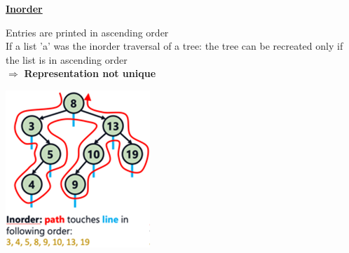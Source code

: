         {\centering\underline{\textbf{Inorder}} \par}
            \begin{minipage}{0.49\linewidth}
                
                Entries are printed in ascending order\\
                If a list 'a' was the inorder traversal of a tree: the tree can be recreated only if the list is in ascending order\\
                $\Rightarrow$ \textbf{Representation not unique}
            \end{minipage}
            \begin{minipage}{0.49\linewidth}
                {\centering \includegraphics[width = 0.85\linewidth]{src/5_data_structure/images/inorder.png} \par}
            \end{minipage}

